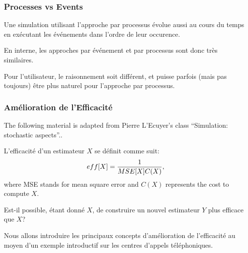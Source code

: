 \documentclass[t,usepdftitle=false]{beamer}
\begin{document}
\begin{frame}
\frametitle{Processes vs Events}

Une simulation utilisant l'approche par processus évolue aussi au
cours du temps en exécutant les événements dans l'ordre de leur
occurence.

\mbox{}

En interne, les approches par événement et par processus sont donc
très similaires.

\mbox{}

Pour l'utilisateur, le raisonnement soit
différent, et puisse parfois (mais pas toujours) être plus naturel pour l'approche par processus.



\end{frame}

\begin{frame}
	\frametitle{Amélioration de l'Efficacité}

The following material is adapted from Pierre L'Ecuyer's class ``Simulation: stochastic aspects''..

\mbox{}
	
	L'efficacité d'un estimateur $X$ se
	définit comme suit:
	$$
	eff[X] = {1\over MSE[X] C(X)},
	$$
	where MSE stands for mean square error and $C(X)$ represents the cost to compute $X$.
	
	\mbox{}
	
	Est-il possible, étant donné $X$, de construire un nouvel estimateur $Y$ plus efficace que $X$?
	
	\mbox{}
	
	Nous allons introduire les principaux concepts d'amélioration de l'efficacité au moyen d'un exemple introductif sur les centres d'appels téléphoniques.
	
\end{frame}
\end{document}
